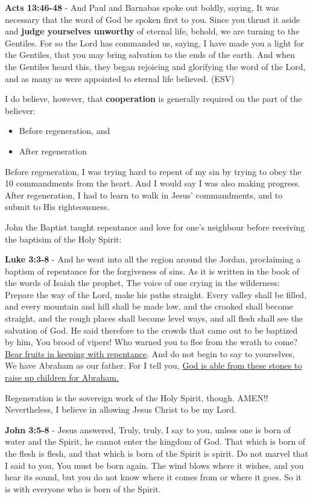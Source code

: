 \documentclass[11pt]{article}
\begin{document}
\textbf{Acts 13:46-48} - And Paul and Barnabas spoke out boldly, saying, It was necessary that the word of God be spoken first to you.  Since you thrust it aside and \textbf{judge yourselves unworthy} of eternal life, behold, we are turning to the Gentiles.  For so the Lord has commanded us, saying, I have made you a light for the Gentiles, that you may bring salvation to the ends of the earth.  And when the Gentiles heard this, they began rejoicing and glorifying the word of the Lord, and as many as were appointed to eternal life believed. (ESV)

I do believe, however, that \textbf{cooperation} is generally required on the part of the believer:
\begin{itemize}
\item Before regeneration, and
\item After regeneration
\end{itemize}

Before regeneration, I was trying hard to repent of my sin by trying to obey the 10 commandments from the heart.
And I would say I was also making progress.
After regeneration, I had to learn to walk in Jesus' commandments, and to submit to His righteousness.

John the Baptist taught repentance and love for one's neighbour before receiving the baptisim of the Holy Spirit:

\textbf{Luke 3:3-8} - And he went into all the region around the Jordan, proclaiming a baptism of repentance for the forgiveness of sins. As it is written in the book of the words of Isaiah the prophet, The voice of one crying in the wilderness: Prepare the way of the Lord, make his paths straight. Every valley shall be filled, and every mountain and hill shall be made low, and the crooked shall become straight, and the rough places shall become level ways, and all flesh shall see the salvation of God. He said therefore to the crowds that came out to be baptized by him, You brood of vipers! Who warned you to flee from the wrath to come? \uline{Bear fruits in keeping with repentance}. And do not begin to say to yourselves, We have Abraham as our father. For I tell you, \uline{God is able from these stones to raise up children for Abraham.}

Regeneration is the sovereign work of the Holy Spirit, though. AMEN!! Nevertheless, I believe in allowing Jesus Christ to be my Lord.

\textbf{John 3:5-8} - Jesus answered, Truly, truly, I say to you, unless one is born of water and the Spirit, he cannot enter the kingdom of God. That which is born of the flesh is flesh, and that which is born of the Spirit is spirit. Do not marvel that I said to you, You must be born again. The wind blows where it wishes, and you hear its sound, but you do not know where it comes from or where it goes. So it is with everyone who is born of the Spirit.
\end{document}
